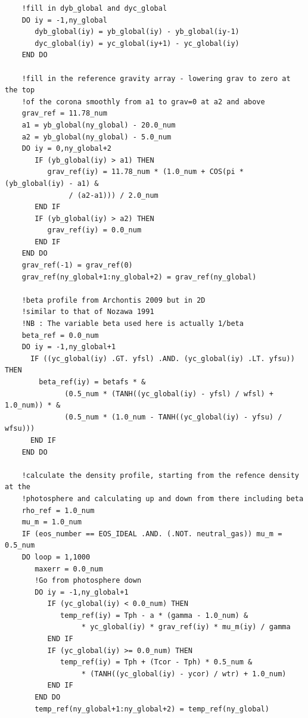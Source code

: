 \documentclass[11pt]{article}
\begin{document}
\begin{verbatim}
    !fill in dyb_global and dyc_global
    DO iy = -1,ny_global
       dyb_global(iy) = yb_global(iy) - yb_global(iy-1)
       dyc_global(iy) = yc_global(iy+1) - yc_global(iy)
    END DO

    !fill in the reference gravity array - lowering grav to zero at the top 
    !of the corona smoothly from a1 to grav=0 at a2 and above
    grav_ref = 11.78_num
    a1 = yb_global(ny_global) - 20.0_num
    a2 = yb_global(ny_global) - 5.0_num
    DO iy = 0,ny_global+2
       IF (yb_global(iy) > a1) THEN
          grav_ref(iy) = 11.78_num * (1.0_num + COS(pi * (yb_global(iy) - a1) &
               / (a2-a1))) / 2.0_num
       END IF
       IF (yb_global(iy) > a2) THEN
          grav_ref(iy) = 0.0_num
       END IF
    END DO    
    grav_ref(-1) = grav_ref(0)
    grav_ref(ny_global+1:ny_global+2) = grav_ref(ny_global)

    !beta profile from Archontis 2009 but in 2D
    !similar to that of Nozawa 1991
    !NB : The variable beta used here is actually 1/beta
    beta_ref = 0.0_num
    DO iy = -1,ny_global+1
      IF ((yc_global(iy) .GT. yfsl) .AND. (yc_global(iy) .LT. yfsu)) THEN
        beta_ref(iy) = betafs * &
              (0.5_num * (TANH((yc_global(iy) - yfsl) / wfsl) + 1.0_num)) * &
              (0.5_num * (1.0_num - TANH((yc_global(iy) - yfsu) / wfsu)))
      END IF
    END DO

    !calculate the density profile, starting from the refence density at the
    !photosphere and calculating up and down from there including beta
    rho_ref = 1.0_num
    mu_m = 1.0_num
    IF (eos_number == EOS_IDEAL .AND. (.NOT. neutral_gas)) mu_m = 0.5_num
    DO loop = 1,1000
       maxerr = 0.0_num
       !Go from photosphere down
       DO iy = -1,ny_global+1
          IF (yc_global(iy) < 0.0_num) THEN
             temp_ref(iy) = Tph - a * (gamma - 1.0_num) &
                  * yc_global(iy) * grav_ref(iy) * mu_m(iy) / gamma 
          END IF
          IF (yc_global(iy) >= 0.0_num) THEN
             temp_ref(iy) = Tph + (Tcor - Tph) * 0.5_num &
                  * (TANH((yc_global(iy) - ycor) / wtr) + 1.0_num)
          END IF
       END DO
       temp_ref(ny_global+1:ny_global+2) = temp_ref(ny_global)


\end{verbatim}
\end{document}
